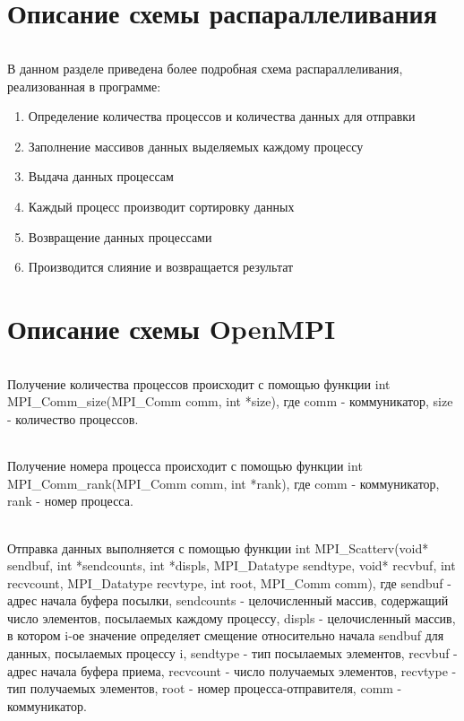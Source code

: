 \documentclass[12pt,a4paper]{article}
\begin{document}
\part*{Описание схемы распараллеливания}
\paragraph{}В данном разделе приведена более подробная схема распараллеливания, реализованная в программе:
\begin{enumerate} 
\item Определение количества процессов и количества данных для отправки
\item Заполнение массивов данных выделяемых каждому процессу
\item Выдача данных процессам
\item Каждый процесс производит сортировку данных
\item Возвращение данных процессами
\item Производится слияние и возвращается результат
\end{enumerate} 

\part*{Описание схемы OpenMPI}
\paragraph{}Получение количества процессов происходит с помощью функции int MPI\_Comm\_size(MPI\_Comm comm, int *size), где comm - коммуникатор, size - количество процессов.
\paragraph{}Получение номера процесса происходит с помощью функции int MPI\_Comm\_rank(MPI\_Comm comm, int *rank), где comm - коммуникатор, rank - номер процесса.
\paragraph{}Отправка данных выполняется с помощью функции int MPI\_Scatterv(void* sendbuf, int *sendcounts, int *displs, MPI\_Datatype sendtype, void* recvbuf, int recvcount, MPI\_Datatype recvtype, int root, MPI\_Comm comm), где sendbuf - адрес начала буфера посылки, sendcounts - целочисленный массив, содержащий число элементов, посылаемых каждому процессу, displs - целочисленный массив, в котором i-ое значение определяет смещение относительно начала sendbuf для данных, посылаемых процессу i, sendtype - тип посылаемых элементов, recvbuf - адрес начала буфера приема, recvcount - число получаемых элементов, recvtype - тип получаемых элементов, root - номер процесса-отправителя, comm - коммуникатор.
\end{document}
